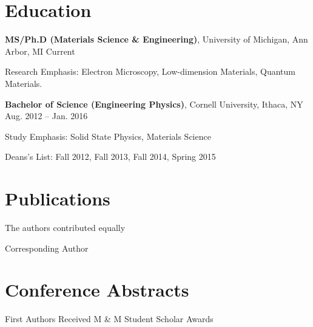 \documentclass{myCV}
\begin{document}
\section*{Education}
    \begin{entry}
        \textbf{MS/Ph.D (Materials Science \& Engineering)}, University of Michigan, Ann Arbor, MI \hfill Current\par
        \sbt{} Research Emphasis: Electron Microscopy, Low-dimension Materials, Quantum Materials.\par
    \end{entry}
    \begin{entry}
        \textbf{Bachelor of Science (Engineering Physics)}, Cornell University, Ithaca, NY \hfill Aug. 2012 -- Jan. 2016\par
        \sbt{} Study Emphasis: Solid State Physics, Materials Science\par
        \sbt{} Deans's List: Fall 2012, Fall 2013, Fall 2014, Spring 2015
    \end{entry}
    
\section*{Publications}

    \begin{entry}
       \upAst{} The authors contributed equally
    \end{entry}
    \begin{entry}
       \upDag{} Corresponding Author
    \end{entry}
    
\clearpage
\section*{Conference Abstracts}
    \begin{entry}
      \upDdag{} First Authors Received M \& M Student Scholar Awards
    \end{entry}
\end{document}
